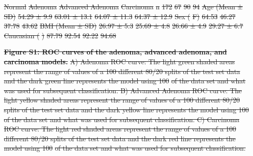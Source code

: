 \documentclass[12pt,]{article}
\providecommand{\DIFdeltex}[1]{{\protect\color{red}\sout{#1}}}                      %
\providecommand{\DIFdel}[1]{\texorpdfstring{\DIFdeltex{#1}}{}} %
\begin{document}
\DIFdel{Normal }%
\DIFdel{Adenoma }%
\DIFdel{Advanced Adenoma }%
\DIFdel{Carcinoma}%
\DIFdel{n }%
\DIFdel{172 }%
\DIFdel{67 }%
\DIFdel{90 }%
\DIFdel{94}%
\DIFdel{Age (Mean ± SD) }%
\DIFdel{54.29 ± 9.9 }%
\DIFdel{63.01 ± 13.1 }%
\DIFdel{64.07 ± 11.3 }%
\DIFdel{64.37 ±
12.9}%
\DIFdel{Sex (}%
\DIFdel{F) }%
\DIFdel{64.53 }%
\DIFdel{46.27 }%
\DIFdel{37.78 }%
\DIFdel{43.62}%
\DIFdel{BMI (Mean ± SD) }%
\DIFdel{26.97 ± 5.3 }%
\DIFdel{25.69 ± 4.8 }%
\DIFdel{26.66 ± 4.9 }%
\DIFdel{29.27 ±
6.7}%
\DIFdel{Caucasian (}%
\DIFdel{) }%
\DIFdel{87.79 }%
\DIFdel{92.54 }%
\DIFdel{92.22 }%
\DIFdel{94.68}%


\textbf{\DIFdel{Figure S1: ROC curves of the adenoma, advanced adenoma, and
carcinoma models.}} %
\DIFdel{A) Adenoma ROC curve: The light green shaded areas
represent the range of values of a 100 different 80/20 splits of the
test set data and the dark green line represents the model using 100}%
\DIFdel{of the data set and what was used for subsequent classification. B)
Advanced Adenoma ROC curve: The light yellow shaded areas represent the
range of values of a 100 different 80/20 splits of the test set data and
the dark yellow line represents the model using 100}%
\DIFdel{of the data set
and what was used for subsequent classification. C) Carcinoma ROC curve:
The light red shaded areas represent the range of values of a 100
different 80/20 splits of the test set data and the dark red line
represents the model using 100}%
\DIFdel{of the data set and what was used for
subsequent classification.
}%
\end{document}
